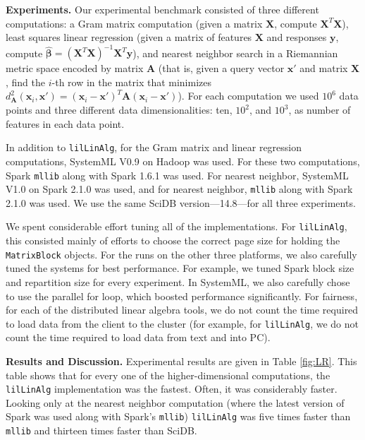 \vspace{5pt}
\noindent
\textbf {Experiments.} Our experimental benchmark consisted of three different computations:
a Gram matrix computation (given a matrix $\textbf{X}$, compute
$\textbf{X}^T \textbf{X}$), least squares linear regression (given a matrix of features $\textbf{X}$ and
responses $\textbf{y}$, compute 
$\hat{\pmb{\beta}} = (\textbf{X}^{T} \textbf{X})^{-1} \textbf{X}^{T} \textbf{y}$), and nearest
neighbor search in a Riemannian metric space \cite{lebanon2006metric} encoded by matrix $\textbf{A}$ (that is,
given a query vector
$\textbf{x}'$ and matrix $\textbf{X}$, find the $i$-th row in the matrix that minimizes 
$d_{\textbf{A}}^2(\textbf{x}_i, \textbf{x}') = 
(\textbf{x}_i - \textbf{x}')^T\textbf{A}(\textbf{x}_i - \textbf{x}')$).  
For each computation we used $10^6$ data points and three different
data dimensionalities: ten, $10^2$, and $10^3$, as number of features in each data point. 

In addition to \texttt{lilLinAlg}, 
for the Gram matrix and linear regression computations, SystemML V0.9 on Hadoop was used.
For these two computations, Spark \texttt{mllib} along with
Spark 1.6.1 was used.  For
nearest neighbor, SystemML V1.0 on Spark 2.1.0 was used, and for
nearest neighbor, \texttt{mllib} along with Spark 2.1.0 was used. We
use the same SciDB version---14.8---for all three
experiments.

We spent considerable effort tuning all of the implementations.
For \texttt{lilLinAlg}, this consisted mainly of efforts to choose the correct page size for holding the
\texttt{MatrixBlock} objects.  
For the runs on the other three platforms, we also carefully tuned the
systems for best performance. For example, we tuned Spark block size and repartition
size for every experiment. In SystemML, we also carefully chose to
use the parallel for loop, which boosted performance significantly.
For fairness, for each of the distributed linear algebra tools, 
we do not count the time required to load data from the client to the cluster
(for example, 
for \texttt{lilLinAlg}, we do not count the time required to load data from text and into PC).

\vspace{5pt}
\noindent
\textbf{Results and Discussion.} Experimental results are given in 
Table \ref{fig:LR}. 
This table shows that for every one of the higher-dimensional computations, the 
\texttt{lilLinAlg} implementation was the fastest.  Often, it was considerably faster.
Looking only at the nearest neighbor computation (where the latest version of Spark was used
along with Spark's \texttt{mllib}) \texttt{lilLinAlg} was five times faster than \texttt{mllib}
and thirteen times faster than SciDB.  

